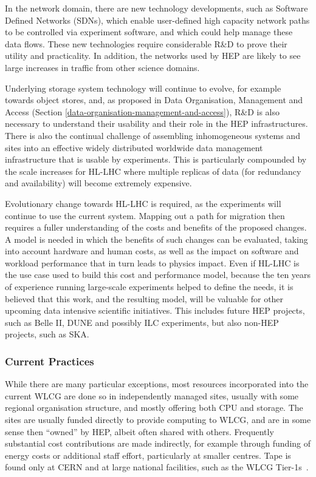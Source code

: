 \documentclass[twocolumn]{svjour3}          %
\begin{document}
In the network domain, there are new technology developments, such as
Software Defined Networks (SDNs), which enable user-defined high
capacity network paths to be controlled via experiment software, and
which could help manage these data flows. These new technologies require
considerable R\&D to prove their utility and practicality. In addition,
the networks used by HEP are likely to see large increases in traffic
from other science domains.

Underlying storage system technology will continue to evolve, for
example towards object stores, and, as proposed in  
Data Organisation, Management and Access  
(Section \ref{data-organisation-management-and-access}),
R\&D is also necessary to understand their usability and their role in
the HEP infrastructures. There is also the continual challenge of
assembling inhomogeneous systems and sites into an effective widely
distributed worldwide data management infrastructure that is usable by
experiments. This is particularly compounded by the scale increases for
HL-LHC where multiple replicas of data (for redundancy and availability)
will become extremely expensive.

Evolutionary change towards HL-LHC is required, as the experiments will
continue to use the current system. Mapping out a path for migration
then requires a fuller understanding of the costs and benefits of the
proposed changes. A model is needed in which the benefits of such
changes can be evaluated, taking into account hardware and human costs,
as well as the impact on software and workload performance that in turn
leads to physics impact. Even if HL-LHC is the use case used to build
this cost and performance model, because the ten years of experience
running large-scale experiments helped to define the needs, it is
believed that this work, and the resulting model, will be valuable for
other upcoming data intensive scientific initiatives. This includes
future HEP projects, such as Belle II, DUNE and possibly ILC
experiments, but also non-HEP projects, such as SKA.

\subsubsection*{Current Practices}

While there are many particular exceptions, most resources incorporated
into the current WLCG are done so in independently managed sites,
usually with some regional organisation structure, and mostly offering
both CPU and storage. The sites are usually funded directly to provide
computing to WLCG, and are in some sense then ``owned'' by HEP, albeit
often shared with others. Frequently substantial cost contributions are
made indirectly, for example through funding of energy costs or
additional staff effort, particularly at smaller centres. Tape is found
only at CERN and at large national facilities, such as the WLCG Tier-1s~\cite{Bird:1695401}.
\end{document}
